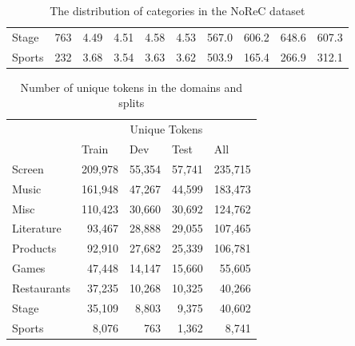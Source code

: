 \begin{table}[]
\begin{tabular}{@{}lrrrrrrrrr@{}}
			Stage       & 763                         & 4.49                      & 4.51                    & 4.58                     & 4.53                    & 567.0                     & 606.2                   & 648.6                    & 607.3                   \\
			Sports      & 232                         & 3.68                      & 3.54                    & 3.63                     & 3.62                    & 503.9                     & 165.4                   & 266.9                    & 312.1                   \\ \bottomrule
		\end{tabular}
	\caption{The distribution of categories in the NoReC dataset}
	\label{tab:cat_dist}
\end{table}

\begin{table}[]
	\centering
	\begin{tabular}{@{}lrrrr@{}}
		\toprule
		& \multicolumn{4}{c}{Unique Tokens}                                                                        \\ \cmidrule(l){2-5} 
		& \multicolumn{1}{l}{Train} & \multicolumn{1}{l}{Dev} & \multicolumn{1}{l}{Test} & \multicolumn{1}{l}{All} \\ \midrule
		Screen      & 209,978                   & 55,354                  & 57,741                   & 235,715                 \\
		Music       & 161,948                   & 47,267                  & 44,599                   & 183,473                 \\
		Misc        & 110,423                   & 30,660                  & 30,692                   & 124,762                 \\
		Literature  & 93,467                    & 28,888                  & 29,055                   & 107,465                 \\
		Products    & 92,910                    & 27,682                  & 25,339                   & 106,781                 \\
		Games       & 47,448                    & 14,147                  & 15,660                   & 55,605                  \\
		Restaurants & 37,235                    & 10,268                  & 10,325                   & 40,266                  \\
		Stage       & 35,109                    & 8,803                   & 9,375                    & 40,602                  \\
		Sports      & 8,076                     & 763                     & 1,362                    & 8,741                   \\ \bottomrule
	\end{tabular}
	\caption{Number of unique tokens in the domains and splits}
\end{table}

